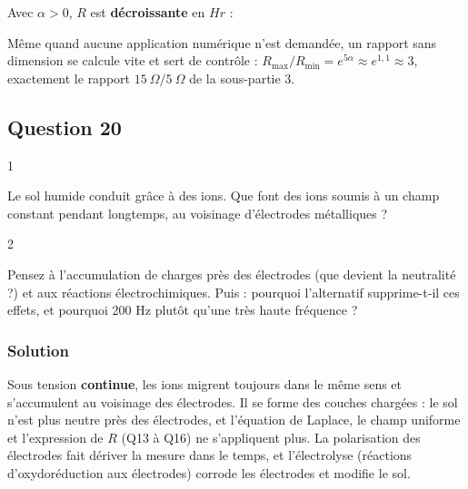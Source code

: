 \documentclass[11pt,a4paper]{article}
\newcommand{\equationajustee}[1]{%
  \sbox{\boiteequation}{$\displaystyle #1$}%
  \ifdim\wd\boiteequation>\linewidth
    \[\resizebox{\linewidth}{!}{\usebox{\boiteequation}}\]%
  \else
    \[#1\]%
  \fi}
\begin{document}
\equationajustee{R(Hr)=\frac{c\rho_0}{ab}\exp\Big(\frac\alpha{Hr}+\beta\Big)}

Avec \(\alpha>0\), \(R\) est \textbf{décroissante} en \(Hr\) :

\equationajustee{\boxed{\begin{aligned}
R_{\min}&=\frac{c\rho_0}{ab}\exp\Big(\frac\alpha{Hr_{\max}}+\beta\Big)\\
R_{\max}&=\frac{c\rho_0}{ab}\exp\Big(\frac\alpha{Hr_{\min}}+\beta\Big)
\end{aligned}}}

\begin{methode}

Même quand aucune application numérique n'est demandée, un rapport sans dimension se calcule vite et sert de contrôle : \(R_{\max}/R_{\min}=e^{5\alpha}\approx e^{1{,}1}\approx3\), exactement le rapport \(15\ \Omega/5\ \Omega\) de la sous-partie 3.

\end{methode}

\hypertarget{question-20}{%
\subsection{Question 20}\label{question-20}}

\begin{indication}{1}

Le sol humide conduit grâce à des ions. Que font des ions soumis à un champ constant pendant longtemps, au voisinage d'électrodes métalliques ?

\end{indication}

\begin{indication}{2}

Pensez à l'accumulation de charges près des électrodes (que devient la neutralité ?) et aux réactions électrochimiques. Puis : pourquoi l'alternatif supprime-t-il ces effets, et pourquoi 200 Hz plutôt qu'une très haute fréquence ?

\end{indication}

\hypertarget{solution-19}{%
\subsubsection{Solution}\label{solution-19}}

Sous tension \textbf{continue}, les ions migrent toujours dans le même sens et s'accumulent au voisinage des électrodes. Il se forme des couches chargées : le sol n'est plus neutre près des électrodes, et l'équation de Laplace, le champ uniforme et l'expression de \(R\) (Q13 à Q16) ne s'appliquent plus. La polarisation des électrodes fait dériver la mesure dans le temps, et l'électrolyse (réactions d'oxydoréduction aux électrodes) corrode les électrodes et modifie le sol.
\end{document}
